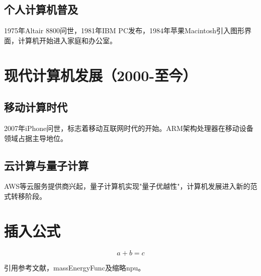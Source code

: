 \subsection{个人计算机普及}
1975年Altair 8800问世，1981年IBM PC发布，1984年苹果Macintosh引入图形界面，计算机开始进入家庭和办公室。

\section{现代计算机发展（2000-至今）}
\subsection{移动计算时代}
2007年iPhone问世，标志着移动互联网时代的开始。ARM架构处理器在移动设备领域占据主导地位。

\subsection{云计算与量子计算}
AWS等云服务提供商兴起，量子计算机实现"量子优越性"，计算机发展进入新的范式转移阶段。

\section{插入公式}
\begin{equation}
a + b = c
\end{equation}

引用参考文献\cite{NWPUThesisLaTeXTemplate}，\gls{massEnergyFunc}及缩略\gls{npu}。